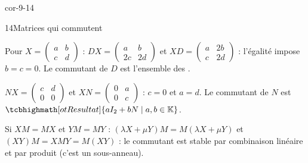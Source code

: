 \begin{blocLivre}{cor-9-14}
\begin{corrige}{14}{Matrices qui commutent}
\begin{questions}
  \item Pour $X=\begin{pmatrix}a&b\\c&d\end{pmatrix}$ :
    $DX=\begin{pmatrix}a&b\\2c&2d\end{pmatrix}$ et
    $XD=\begin{pmatrix}a&2b\\c&2d\end{pmatrix}$ : l'égalité impose
    $b=c=0$. Le commutant de $D$ est l'ensemble des
    .
  \item $NX=\begin{pmatrix}c&d\\0&0\end{pmatrix}$ et
    $XN=\begin{pmatrix}0&a\\0&c\end{pmatrix}$ : $c=0$ et $a=d$. Le
    commutant de $N$ est $\res{\ens{aI_2+bN \mid a,b\in\K}}$.
  \item Si $XM=MX$ et $YM=MY$ : $(\lambda X+\mu Y)M=M(\lambda X+\mu Y)$
    et $(XY)M=XMY=M(XY)$ : le commutant est stable par combinaison
    linéaire et par produit (c'est un sous-anneau).
\end{questions}
\end{corrige}
\end{blocLivre}

